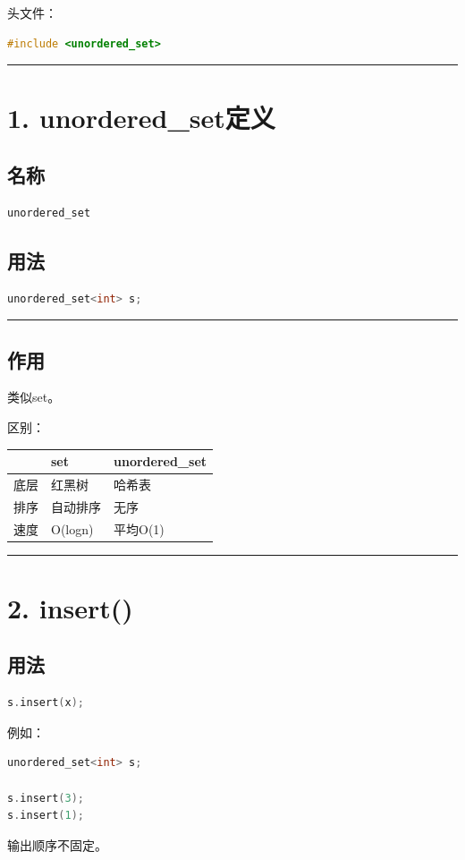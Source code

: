 \documentclass[9pt,twocolumn]{extarticle}
\begin{document}
头文件：
\begin{lstlisting}[language=C++]
#include <unordered_set>
\end{lstlisting}

\noindent\rule{\linewidth}{0.4pt}

\section{1. unordered\_set定义}

\subsection{名称}
\begin{lstlisting}[language=C++]
unordered_set
\end{lstlisting}

\subsection{用法}
\begin{lstlisting}[language=C++]
unordered_set<int> s;
\end{lstlisting}

\noindent\rule{\linewidth}{0.4pt}

\subsection{作用}
类似set。

区别：
\begin{table}[h]
\centering
\begin{tabular}{|l|l|l|}
\hline
 & set & unordered\_set \\ \hline
底层 & 红黑树 & 哈希表 \\ \hline
排序 & 自动排序 & 无序 \\ \hline
速度 & O(logn) & 平均O(1) \\ \hline
\end{tabular}
\end{table}

\noindent\rule{\linewidth}{0.4pt}

\section{2. insert()}

\subsection{用法}
\begin{lstlisting}[language=C++]
s.insert(x);
\end{lstlisting}
例如：
\begin{lstlisting}[language=C++]
unordered_set<int> s;

s.insert(3);
s.insert(1);
\end{lstlisting}
输出顺序不固定。
\end{document}
